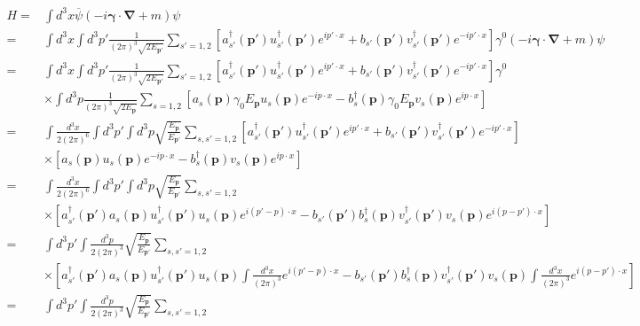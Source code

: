 \begin{align}
  H=&\int d^3x\overline{\psi}\left(-i\boldsymbol{\gamma}\cdot\boldsymbol{\nabla}+m\right)\psi\nonumber\\
=&\int d^3x\int d^3p'\frac{1}{(2\pi)^3\sqrt{2 E_{\mathbf{p}'}}}\sum_{s'=1,2}\left[a_{s'}^\dagger(\mathbf{p}')u^\dagger_{s'}(\mathbf{p}')e^{i p'\cdot x}
+b_{s'}(\mathbf{p}')v^\dagger_{s'}(\mathbf{p}')e^{-i p'\cdot x}\right]\gamma^0
\left(-i\boldsymbol{\gamma}\cdot\boldsymbol{\nabla}+m\right)\psi\nonumber\\
=&\int d^3x\int d^3p'\frac{1}{(2\pi)^3\sqrt{2 E_{\mathbf{p}'}}}\sum_{s'=1,2}\left[a_{s'}^\dagger(\mathbf{p}')u^\dagger_{s'}(\mathbf{p}')e^{i p'\cdot x}
+b_{s'}(\mathbf{p}')v^\dagger_{s'}(\mathbf{p}')e^{-i p'\cdot x}\right]\gamma^0\nonumber\\
&\times\int d^3p\frac{1}{(2\pi)^3\sqrt{2 E_{\mathbf{p}}}}\sum_{s=1,2}\left[a_s(\mathbf{p})\gamma_0 E_{\mathbf{p}}u_s(\mathbf{p})e^{-i p\cdot x}
-b_s^\dagger(\mathbf{p})\gamma_0 E_{\mathbf{p}}v_s(\mathbf{p})e^{i p\cdot x}\right]\nonumber\\
 =&\int \frac{d^3x}{2(2\pi)^6}\int d^3p'\int d^3p\sqrt{\frac{E_{\mathbf{p}}}{E_{\mathbf{p}'}}}\sum_{s,s'=1,2}\left[a_{s'}^\dagger(\mathbf{p}')u_{s'}^\dagger(\mathbf{p}')e^{i p'\cdot x}
+b_{s'}(\mathbf{p}')v_{s'}^\dagger(\mathbf{p}')e^{-i p'\cdot x}\right]\nonumber\\
&\times\left[a_s(\mathbf{p}) u_s(\mathbf{p})e^{-i p\cdot x}
-b_s^\dagger(\mathbf{p}) v_s(\mathbf{p})e^{i p\cdot x}\right]\nonumber\\
 =&\int \frac{d^3x}{2(2\pi)^6}\int d^3p'\int d^3p\sqrt{\frac{E_{\mathbf{p}}}{E_{\mathbf{p}'}}}\sum_{s,s'=1,2}\nonumber\\
&\times\left[a_{s'}^\dagger(\mathbf{p}')a_{s}(\mathbf{p})u_{s'}^\dagger(\mathbf{p}') u_s(\mathbf{p})e^{i(p'-p)\cdot x}
-b_{s'}(\mathbf{p}')b_{s}^\dagger(\mathbf{p})v_{s'}^\dagger(\mathbf{p}') v_{s}(\mathbf{p})e^{i (p-p')\cdot x}\right]\nonumber\\
 =&\int d^3p'\int \frac{d^3p}{2(2\pi)^3}\sqrt{\frac{E_{\mathbf{p}}}{E_{\mathbf{p}'}}}\sum_{s,s'=1,2}\nonumber\\
&\times\left[a_{s'}^\dagger(\mathbf{p}')a_{s}(\mathbf{p})u_{s'}^\dagger(\mathbf{p}') u_s(\mathbf{p})\int \frac{d^3x}{(2\pi)^3}e^{i(p'-p)\cdot x}
-b_{s'}(\mathbf{p}')b_{s}^\dagger(\mathbf{p})v_{s'}^\dagger(\mathbf{p}') v_{s}(\mathbf{p})\int \frac{d^3x}{(2\pi)^3}e^{i (p-p')\cdot x}\right]\nonumber\\
 =&\int d^3p'\int \frac{d^3p}{2(2\pi)^3}\sqrt{\frac{E_{\mathbf{p}}}{E_{\mathbf{p}'}}}\sum_{s,s'=1,2}\nonumber\\

\end{align}
